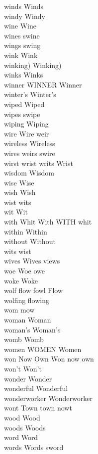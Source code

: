 winds Winds\\
windy Windy\\
wine Wine\\
wines swine\\
wings swing\\
wink Wink\\
winking) Winking)\\
winks Winks\\
winner WINNER Winner\\
winter's Winter's\\
wiped Wiped\\
wipes swipe\\
wiping Wiping\\
wire Wire weir\\
wireless Wireless\\
wires weirs swire\\
wirst wrist writs Wrist\\
wisdom Wisdom\\
wise Wise\\
wish Wish\\
wist wits\\
wit Wit\\
with Whit With WITH whit\\
within Within\\
without Without\\
wits wist\\
wives Wives views\\
woe Woe owe\\
woke Woke\\
wolf flow fowl Flow\\
wolfing flowing\\
wom mow\\
woman Woman\\
woman's Woman's\\
womb Womb\\
women WOMEN Women\\
won Now Own Won now own\\
won't Won't\\
wonder Wonder\\
wonderful Wonderful\\
wonderworker Wonderworker\\
wont Town town nowt\\
wood Wood\\
woods Woods\\
word Word\\
words Words sword\\
